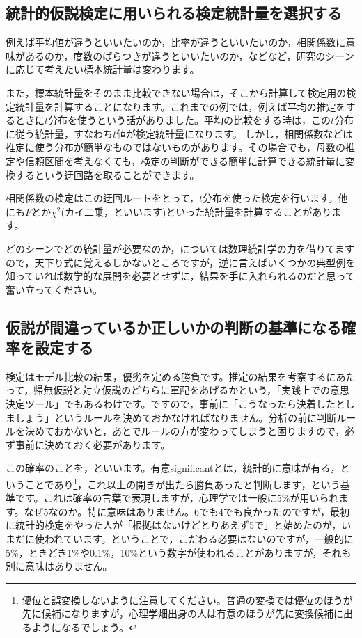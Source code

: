 \documentclass{ltjsbook}
\begin{document}
\subsection{統計的仮説検定に用いられる検定統計量を選択する}
例えば平均値が違うといいたいのか，比率が違うといいたいのか，相関係数に意味があるのか，度数のばらつきが違うといいたいのか，などなど，研究のシーンに応じて考えたい標本統計量は変わります。

また，標本統計量をそのまま比較できない場合は，そこから計算して検定用の検定統計量を計算することになります。これまでの例では，例えば平均の推定をするときに$t$分布を使うという話がありました。平均の比較をする時は，この$t$分布に従う統計量，すなわち$t$値が検定統計量になります。
しかし，相関係数などは推定に使う分布が簡単なものではないものがあります。その場合でも，母数の推定や信頼区間を考えなくても，検定の判断ができる簡単に計算できる統計量に変換するという迂回路を取ることができます。

相関係数の検定はこの迂回ルートをとって，$t$分布を使った検定を行います。他にも$F$とか$\chi^2$(カイ二乗，といいます)といった統計量を計算することがあります。

どのシーンでどの統計量が必要なのか，については数理統計学の力を借りてますので，天下り式に覚えるしかないところですが，逆に言えばいくつかの典型例を知っていれば数学的な展開を必要とせずに，結果を手に入れられるのだと思って奮い立ってください。

\subsection{仮説が間違っているか正しいかの判断の基準になる確率を設定する}
検定はモデル比較の結果，優劣を定める勝負です。推定の結果を考察するにあたって，帰無仮説と対立仮説のどちらに軍配をあげるかという，「実践上での意思決定ツール」でもあるわけです。ですので，事前に「こうなったら決着したとしましょう」というルールを決めておかなければなりません。分析の前に判断ルールを決めておかないと，あとでルールの方が変わってしまうと困りますので，必ず事前に決めておく必要があります。

この確率のことを，といいます。有意significantとは，統計的に意味が有る，ということであり\footnote{優位と誤変換しないように注意してください。普通の変換では優位のほうが先に候補になりますが，心理学畑出身の人は有意のほうが先に変換候補に出るようになるでしょう。}，これ以上の開きが出たら勝負あったと判断します，という基準です。これは確率の言葉で表現しますが，心理学では一般に5\%が用いられます。なぜ5なのか。特に意味はありません。6でも4でも良かったのですが，最初に統計的検定をやった人が「根拠はないけどとりあえず5で」と始めたのが，いまだに使われています。ということで，こだわる必要はないのですが，一般的に5\%，ときどき1\%や0.1\%，10\%という数字が使われることがありますが，それも別に意味はありません。
\end{document}
